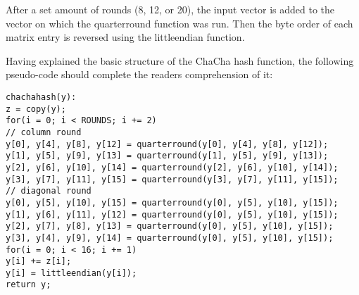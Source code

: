 \noindent After a set amount of rounds (8, 12, or 20), the input vector is added to the vector on which the quarterround function was run. Then the byte order of each matrix entry is reversed using the littleendian function.

Having explained the basic structure of the ChaCha hash function, the following pseudo-code should complete the readers comprehension of it:

\begin{center}
\begin{minipage}{\linewidth}
\texttt{chachahash(y):} \\
\hspace*{1em}\texttt{z = copy(y);}\\
\hspace*{1em}\texttt{for(i = 0; i < ROUNDS; i += 2)}\\
\hspace*{2em}\texttt{// column round}\\
\hspace*{2em}\texttt{y[0], y[4], y[8], y[12] = quarterround(y[0], y[4], y[8], y[12]);}\\
\hspace*{2em}\texttt{y[1], y[5], y[9], y[13] = quarterround(y[1], y[5], y[9], y[13]);}\\
\hspace*{2em}\texttt{y[2], y[6], y[10], y[14] = quarterround(y[2], y[6], y[10], y[14]);}\\
\hspace*{2em}\texttt{y[3], y[7], y[11], y[15] = quarterround(y[3], y[7], y[11], y[15]);}\\
\hspace*{2em}\texttt{// diagonal round}\\
\hspace*{2em}\texttt{y[0], y[5], y[10], y[15] = quarterround(y[0], y[5], y[10], y[15]);}\\
\hspace*{2em}\texttt{y[1], y[6], y[11], y[12] = quarterround(y[0], y[5], y[10], y[15]);}\\
\hspace*{2em}\texttt{y[2], y[7], y[8], y[13] = quarterround(y[0], y[5], y[10], y[15]);}\\
\hspace*{2em}\texttt{y[3], y[4], y[9], y[14] = quarterround(y[0], y[5], y[10], y[15]);}\\
\hspace*{1em}\texttt{for(i = 0; i < 16; i += 1)}\\
\hspace*{2em}\texttt{y[i] += z[i];}\\
\hspace*{2em}\texttt{y[i] = littleendian(y[i]);}\\
\hspace*{1em}\texttt{return y;}
\end{minipage}
\end{center}